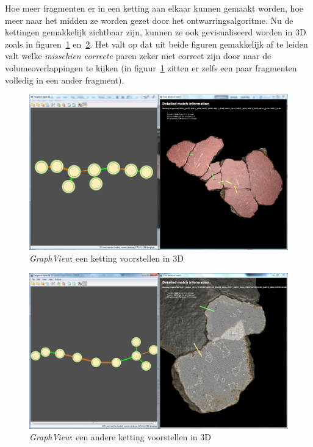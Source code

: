 Hoe meer fragmenten er in een ketting aan elkaar kunnen gemaakt worden, hoe meer naar het midden ze worden gezet door het ontwarringsalgoritme. Nu de kettingen gemakkelijk zichtbaar zijn, kunnen ze ook gevisualiseerd worden in 3D zoals in figuren~\ref{fig:graphchain1} en~\ref{fig:graphchain2}. Het valt op dat uit beide figuren gemakkelijk af te leiden valt welke \emph{misschien correcte} paren zeker niet correct zijn door naar de volumeoverlappingen te kijken (in figuur~\ref{fig:graphchain1} zitten er zelfs een paar fragmenten volledig in een ander fragment).

\begin{figure}[ht]
	\begin{center}
		\includegraphics[width=1.0\columnwidth]{images/detailview-chain-02-rawcut.png}
		\caption{\emph{GraphView}: een ketting voorstellen in 3D}
		\label{fig:graphchain1}
	\end{center}
\end{figure}

\begin{figure}[ht]
	\begin{center}
		\includegraphics[width=1.0\columnwidth]{images/detailview-chain-10-rawcut.png}
		\caption{\emph{GraphView}: een andere ketting voorstellen in 3D}
		\label{fig:graphchain2}
	\end{center}
\end{figure}